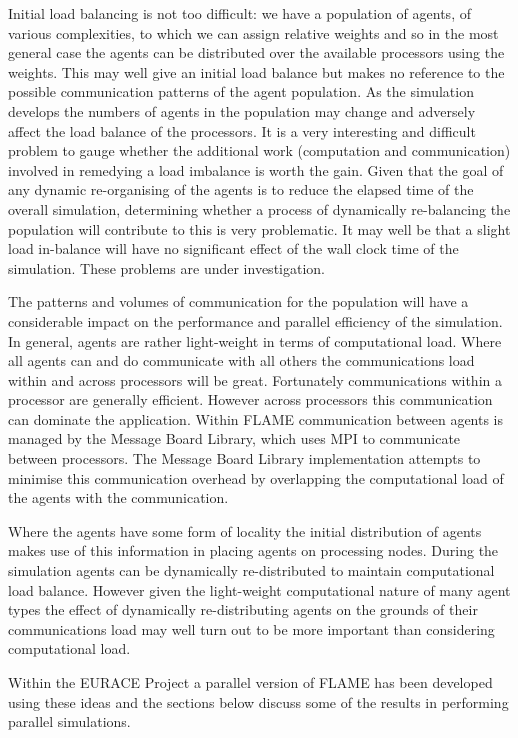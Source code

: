 Initial load balancing is not too difficult: we have a population of agents, of various complexities, to which we can assign relative weights and so in the most general case the agents can be distributed over the available processors using the weights. This may well give an initial load balance but makes no reference to the possible communication patterns of the agent population. As the simulation develops the numbers of agents in the population may change and adversely affect the load balance of the processors. It is a very interesting and difficult problem to gauge whether the additional work (computation and communication) involved in remedying a load imbalance  is worth the gain. Given that the goal of any dynamic re-organising of the agents is to reduce the elapsed time of the overall simulation, determining whether a process of dynamically re-balancing the population will contribute to this is very problematic. It may well be that a slight load in-balance will have no significant effect of the wall clock time of the simulation. These problems are under investigation.

The patterns and volumes of communication for the population will have a considerable impact on the performance and parallel efficiency of the simulation. In general, agents are rather light-weight in terms of computational load. Where all agents can and do communicate with all others the communications load within and across processors will be great. Fortunately communications within a processor are generally efficient. However across processors this communication can dominate the application. Within FLAME communication between agents is managed by the Message Board Library, which uses MPI to communicate between processors. The Message Board Library implementation attempts to minimise this communication overhead by overlapping the computational load of the agents with the communication. 

Where the agents have some form of locality the initial distribution of agents makes use of this information in placing agents on processing nodes. During the simulation agents can be dynamically re-distributed to maintain computational load balance. However given the light-weight computational nature of many agent types the effect of dynamically re-distributing agents on the grounds of their communications load may well turn out to be more important than considering computational load.

Within the EURACE Project a parallel version of FLAME has been developed using these ideas and the sections below discuss some of the results in performing parallel simulations.

